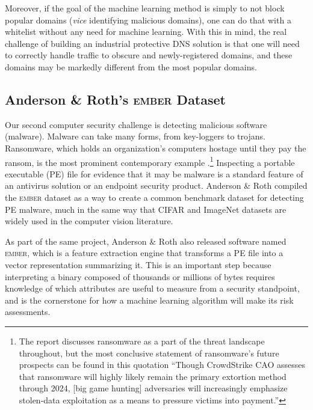 \documentclass[conference]{IEEEtran}
\begin{document}
    Moreover, if the goal of the machine learning method is simply to not block popular domains (\textit{vice} identifying malicious domains), one can do that with a whitelist without any need for machine learning. With this in mind, the real challenge of building an industrial protective DNS solution is that one will need to correctly handle traffic to obscure and newly-registered domains, and these domains may be markedly different from the most popular domains.


\subsection{Anderson \& Roth's \textsc{ember} Dataset}

    Our second computer security challenge is detecting malicious software (malware). Malware can take many forms, from key-loggers to trojans. Ransomware, which holds an organization's computers hostage until they pay the ransom, is the most prominent contemporary example \cite{crowdstrike-2024}.\footnote{The report discusses ransomware as a part of the threat landscape throughout, but the most conclusive statement of ransomware's future prospects can be found in this quotation ``Though CrowdStrike CAO assesses that ransomware will highly likely remain the primary extortion method through 2024, [big game hunting] adversaries will increasingly emphasize stolen-data exploitation as a means to pressure victims into payment.''} Inspecting a portable executable (PE) file for evidence that it may be malware is a standard feature of an antivirus solution or an endpoint security product. Anderson \& Roth compiled the \textsc{ember} dataset as a way to create a common benchmark dataset for detecting PE malware, much in the same way that \textsc{CIFAR} and ImageNet datasets are widely used in the computer vision literature. 

    As part of the same project, Anderson \& Roth also released software named \textsc{ember}, which is a feature extraction engine that transforms a PE file into a vector representation summarizing it. This is an important step because interpreting a binary composed of thousands or millions of bytes requires knowledge of which attributes are useful to measure from a security standpoint, and is the cornerstone for how a machine learning algorithm will make its risk assessments.
\end{document}
